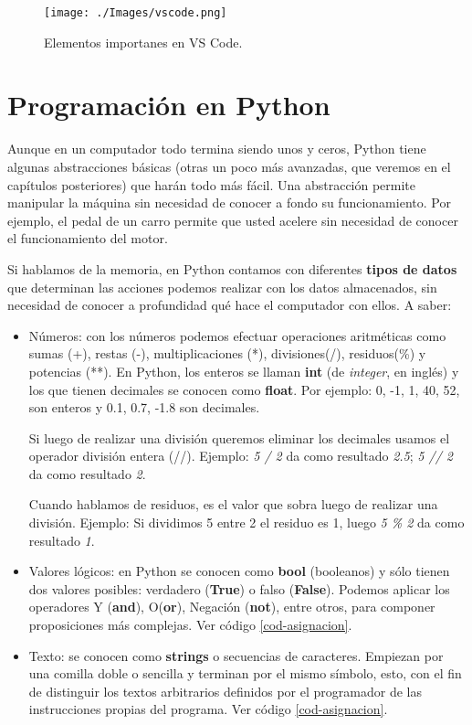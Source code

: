 \begin{figure}[h!]
	\centering
	\texttt{[image: ./Images/vscode.png]}
	\caption{Elementos importanes en VS Code.}
	\label{vscode}
\end{figure}

\section{Programación en Python}

Aunque en un computador todo termina siendo unos y ceros, Python tiene algunas abstracciones básicas (otras un poco más avanzadas, que veremos en el capítulos posteriores) que harán todo más fácil. Una abstracción permite manipular la máquina sin necesidad de conocer a fondo su funcionamiento. Por ejemplo, el pedal de un carro permite que usted acelere sin necesidad de conocer el funcionamiento del motor. 

Si hablamos de la memoria, en Python contamos con diferentes \textbf{tipos de datos} que determinan las acciones podemos realizar con los datos almacenados, sin necesidad de conocer a profundidad qué hace el computador con ellos. A saber:

\begin{itemize}
\item Números: con los números podemos efectuar operaciones aritméticas como sumas (+), restas (-), multiplicaciones (*), divisiones(/), residuos(\%) y potencias (**). En Python, los enteros se llaman \textbf{int} (de \emph{integer}, en inglés) y los que tienen decimales se conocen como \textbf{float}. Por ejemplo: 0, -1, 1, 40, 52, son enteros y 0.1, 0.7, -1.8 son decimales. 

Si luego de realizar una división queremos eliminar los decimales usamos el operador división entera (//). Ejemplo: \emph{5 / 2} da como resultado \emph{2.5}; \emph{5 // 2} da como resultado \emph{2}.

Cuando hablamos de residuos, es el valor que sobra luego de realizar una división. Ejemplo: Si dividimos 5 entre 2 el residuo es 1, luego \emph{5 \% 2} da como resultado \emph{1}.

\item Valores lógicos: en Python se conocen como \textbf{bool} (booleanos) y sólo tienen dos valores posibles: verdadero (\textbf{True}) o falso (\textbf{False}). Podemos aplicar los operadores Y (\textbf{and}), O(\textbf{or}), Negación (\textbf{not}), entre otros, para componer proposiciones más complejas.  Ver código \ref{cod-asignacion}.

\item Texto: se conocen como \textbf{strings} o secuencias de caracteres. Empiezan por una comilla doble o sencilla y terminan por el mismo símbolo, esto, con el fin de distinguir los textos arbitrarios definidos por el programador de las instrucciones propias del programa. Ver código \ref{cod-asignacion}.
\end{itemize}

